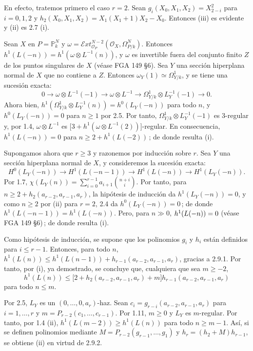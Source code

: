 En efecto, tratemos primero el caso \(r=2\). Sean
\(g_i(X_0,X_1,X_2)=X_{2-i}^2\) para \(i=0,1,2\) y
\(h_2(X_0,X_1,X_2)=X_1(X_1+1)X_2-X_0\). Entonces (iii) es evidente y (ii)
es 2.7 (i).

Sean \(X\) en \(P=\mathbb P_k^N\) y
\(\omega=\mathcal E\!xt^{N-2}_{\mathcal O_P}(\mathcal O_X,\Omega^N_{P/k})\).
Entonces \(h^1(L(-n))=h^1(\omega\otimes L^{-1}(n))\), y \(\omega\) es
invertible fuera del conjunto finito \(Z\) de los puntos singulares de \(X\)
(véase FGA 149 \S 6). Sea \(Y\) una sección hiperplana normal de \(X\) que
no contiene a \(Z\). Entonces \(\omega_Y(1)\simeq\Omega^1_{Y/k}\), y se tiene
una sucesión exacta:
\[
0\longrightarrow \omega\otimes L^{-1}(-1)
\longrightarrow \omega\otimes L^{-1}
\longrightarrow \Omega^1_{Y/k}\otimes L_Y^{-1}(-1)
\longrightarrow0.
\]
Ahora bien, \(h^1(\Omega^1_{Y/k}\otimes L_Y^{-1}(n))=h^0(L_Y(-n))\) para
todo \(n\), y \(h^0(L_Y(-n))=0\) para \(n\ge1\) por 2.5. Por tanto,
\(\Omega^1_{Y/k}\otimes L_Y^{-1}(-1)\) es 3-regular y, por 1.4,
\(\omega\otimes L^{-1}\) es
\(\bigl[3+h^1(\omega\otimes L^{-1}(2))\bigr]\)-regular. En consecuencia,
\(h^1(L(-n))=0\) para \(n\ge2+h^1(L(-2))\)\,; de donde resulta (i).

Supongamos ahora que \(r\ge3\) y razonemos por inducción sobre \(r\). Sea
\(Y\) una sección hiperplana normal de \(X\), y consideremos la sucesión
exacta:
\[
H^0(L_Y(-n))\longrightarrow H^1(L(-n-1))
\longrightarrow H^1(L(-n))\longrightarrow H^1(L_Y(-n)).
\tag{2.9.1}
\]
Por 1.7,
\(\chi(L_Y(n))=\sum_{i=0}^{r-1}a_{i+1}\binom{n+i}{i}\). Por tanto, para
\(n\ge2+h_2(a_{r-2},a_{r-1},a_r)\), la hipótesis de inducción da
\(h^1(L_Y(-n))=0\), y como \(n\ge2\) por (ii) para \(r=2\), 2.4 da
\(h^0(L_Y(-n))=0\)\,; de donde
\(h^1(L(-n-1))=h^1(L(-n))\). Pero, para \(n\gg0\),
\(h^1(L(\sisi{n}{-n}))=0\) (véase FGA 149 \S 6)\,; de donde resulta (i). %

Como hipótesis de inducción, se supone que los polinomios \(g_i\) y \(h_i\)
están definidos para \(i\le r-1\). Entonces, para todo \(n\),
\(h^1(L(n))\le h^1(L(n-1))+h_{r-1}(a_{r-2},a_{r-1},a_r)\), gracias a
2.9.1. Por tanto, por (i), ya demostrado, se concluye que, cualquiera que sea
\(m\ge -2\),
\[
h^1(L(n))\le
\bigl[2+h_2(a_{r-2},a_{r-1},a_r)+m\bigr]
h_{r-1}(a_{r-2},a_{r-1},a_r)
\tag{2.9.2}
\]
para todo \(n\le m\).

Por 2.5, \(L_Y\) es un \((0,\ldots,0,a_r)\)-haz. Sean
\(c_i=g_{r-i}(a_{r-2},a_{r-1},a_r)\) para \(i=1,\ldots,r\) y
\(m=P_{r-2}(c_1,\ldots,c_{r-1})\). Por 1.11, \(m\ge0\) y \(L_Y\) es
\(m\)-regular. Por tanto, por 1.4 (ii),
\(h^1(L(m-2))\ge h^1(L(n))\) para todo \(n\ge m-1\). Así, si se definen
polinomios mediante \(M=P_{r-2}(g_{r-1},\ldots,g_1)\) y
\(h_r=(h_2+M)h_{r-1}\), se obtiene (ii) en virtud de 2.9.2.

